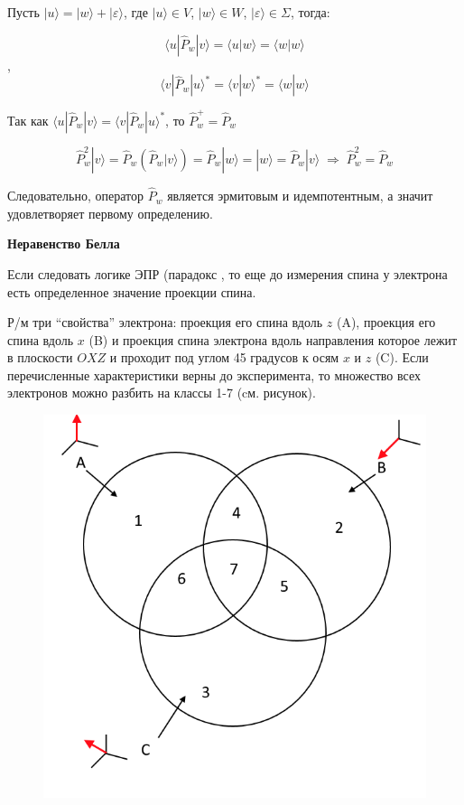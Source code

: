 \documentclass[__main__.tex]{subfiles}
\begin{document}
Пусть $|u\rangle = |w\rangle + |\varepsilon\rangle$, где $|u\rangle \in V$, $|w\rangle \in W$, $|\varepsilon\rangle \in \Sigma$, тогда:

$$\langle u | \hat{P}_w | v \rangle = \langle u | w \rangle = \langle w | w \rangle$$,
$$\langle v | \hat{P}_w | u \rangle^{*} = \langle v | w \rangle^{*} = \langle w | w \rangle$$

Так как $\langle u | \hat{P}_w | v \rangle = \langle v | \hat{P}_w | u \rangle^{*}$, то $\hat{P}^{+}_w = \hat{P}_w$

$$\hat{P}^2_w | v \rangle = \hat{P}_w \left(\hat{P}_w | v \rangle \right) = \hat{P}_w | w \rangle = |w\rangle = \hat{P}_w | v \rangle \; \Rightarrow \; \hat{P}^2_w = \hat{P}_w$$

Следовательно, оператор $\hat{P}_w$ является эрмитовым и идемпотентным, а значит удовлетворяет первому определению. 

\textbf{Неравенство Белла}

Если следовать логике ЭПР (парадокс , то еще до измерения спина у электрона есть определенное значение проекции спина.

Р/м три ``свойства'' электрона: проекция его спина вдоль $z$ (A), проекция его спина вдоль $x$ (B) и проекция спина электрона вдоль направления которое лежит в плоскости $OXZ$ и проходит под углом 45 градусов к осям $x$ и $z$ (C). Если перечисленные характеристики верны до эксперимента, то множество всех электронов можно разбить на классы 1-7 (cм. рисунок).\\

\begin{figure}
	\includegraphics[width=1\linewidth]{img/Ч-07_1}{}
\end{figure}
\end{document}
